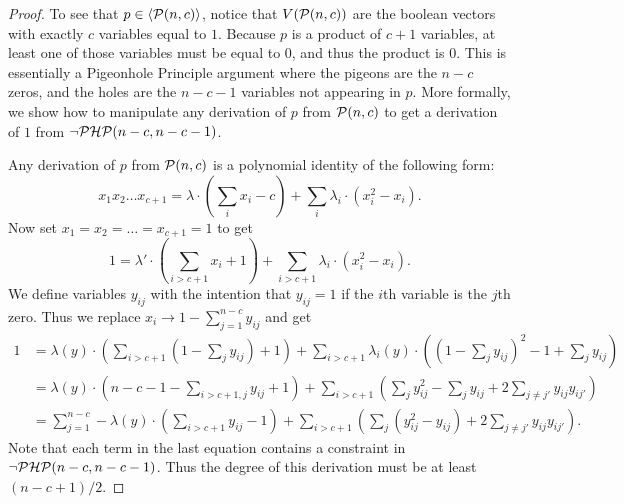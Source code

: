 \begin{proof}
To see that $p \in \langle \mathcal P(n,c) \rangle$, notice that $V(\mathcal P(n,c))$ are the boolean vectors with exactly $c$ variables equal to $1$.
Because $p$ is a product of $c+1$ variables, at least one of those variables must be equal to $0$, and thus the product is $0$. 
This is essentially a Pigeonhole Principle argument where the pigeons are the $n-c$ zeros, and the holes are the $n-c-1$ variables not appearing in $p$.
More formally, we show how to manipulate any derivation of $p$ from $\mathcal P(n,c)$ to get a derivation of $1$ from $\neg\mathcal P\mathcal H\mathcal P(n-c,n-c-1)$.

Any derivation of $p$ from $\mathcal P(n,c)$ is a polynomial identity of the following form:
\[x_1x_2\dots x_{c+1} = \lambda \cdot (\sum_i x_i - c) + \sum_i \lambda_i \cdot (x_i^2 - x_i).\]
Now set $x_1 = x_2 = \dots = x_{c+1} = 1$ to get
\[1 = \lambda' \cdot (\sum_{i > c+1} x_i + 1) + \sum_{i > c+1} \lambda_i \cdot (x_i^2 - x_i).\]
We define variables $y_{ij}$ with the intention that $y_{ij} = 1$ if the $i$th variable is the $j$th zero. Thus we replace $x_i \rightarrow 1 - \sum_{j=1}^{n-c} y_{ij}$ and get
\begin{align*}
1 &= \lambda(y) \cdot \left(\sum_{i > c+1} \left(1 - \sum_j y_{ij}\right) + 1\right) + \sum_{i > c+1} \lambda_i(y) \cdot \left( \left(1 - \sum_j y_{ij}\right)^2 - 1 + \sum_j y_{ij}\right) \\
&= \lambda(y) \cdot \left(n-c-1 - \sum_{i> c+1, j} y_{ij} + 1\right) + \sum_{i > c+1} \left(\sum_j y_{ij}^2 - \sum_j y_{ij} + 2\sum_{j\neq j'} y_{ij}y_{ij'}\right) \\
&= \sum_{j=1}^{n-c} -\lambda(y)\cdot\left(\sum_{i > c+1} y_{ij} - 1\right) + \sum_{i > c+1} \left(\sum_j \left(y_{ij}^2 - y_{ij}\right) + 2\sum_{j\neq j'} y_{ij}y_{ij'}\right).
\end{align*}
Note that each term in the last equation contains a constraint in $\neg\mathcal P\mathcal H\mathcal P(n-c,n-c-1)$. Thus the degree of this derivation must be at least  $(n-c+1)/2$.
\end{proof}

